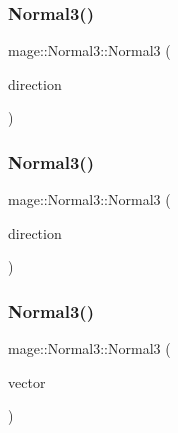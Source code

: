 \hypertarget{structmage_1_1_normal3_a0942e7aace8354f0a414f77ccf90b69c}{}\label{structmage_1_1_normal3_a0942e7aace8354f0a414f77ccf90b69c} 
\subsubsection{\texorpdfstring{Normal3()}{Normal3()}\hspace{0.1cm}{\footnotesize\ttfamily [7/10]}}
{\footnotesize\ttfamily mage\+::\+Normal3\+::\+Normal3 (\begin{DoxyParamCaption}\item[{const \hyperlink{structmage_1_1_direction3}{Direction3} \&}]{direction }\end{DoxyParamCaption})\hspace{0.3cm}{\ttfamily [explicit]}}

\hypertarget{structmage_1_1_normal3_a3799d741c08159f26f5ae13b2df98c56}{}\label{structmage_1_1_normal3_a3799d741c08159f26f5ae13b2df98c56} 
\subsubsection{\texorpdfstring{Normal3()}{Normal3()}\hspace{0.1cm}{\footnotesize\ttfamily [8/10]}}
{\footnotesize\ttfamily mage\+::\+Normal3\+::\+Normal3 (\begin{DoxyParamCaption}\item[{\hyperlink{structmage_1_1_direction3}{Direction3} \&\&}]{direction }\end{DoxyParamCaption})\hspace{0.3cm}{\ttfamily [explicit]}}

\hypertarget{structmage_1_1_normal3_a61565f1183535666a2fb5183b83bebd2}{}\label{structmage_1_1_normal3_a61565f1183535666a2fb5183b83bebd2} 
\subsubsection{\texorpdfstring{Normal3()}{Normal3()}\hspace{0.1cm}{\footnotesize\ttfamily [9/10]}}
{\footnotesize\ttfamily mage\+::\+Normal3\+::\+Normal3 (\begin{DoxyParamCaption}\item[{const X\+M\+F\+L\+O\+A\+T3 \&}]{vector }\end{DoxyParamCaption})\hspace{0.3cm}{\ttfamily [explicit]}}

